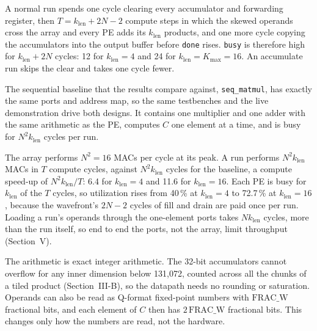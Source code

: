 A normal run spends one cycle clearing every accumulator and forwarding register, then $T = k_{\mathrm{len}} + 2N - 2$ compute steps in which the skewed operands cross the array and every PE adds its $k_{\mathrm{len}}$ products, and one more cycle copying the accumulators into the output buffer before \texttt{done} rises. \texttt{busy} is therefore high for $k_{\mathrm{len}} + 2N$ cycles: 12 for $k_{\mathrm{len}} = 4$ and 24 for $k_{\mathrm{len}} = K_{\max} = 16$. An accumulate run skips the clear and takes one cycle fewer.

The sequential baseline that the results compare against, \texttt{seq\_matmul}, has exactly the same ports and address map, so the same testbenches and the live demonstration drive both designs. It contains one multiplier and one adder with the same arithmetic as the PE, computes $C$ one element at a time, and is busy for $N^2 k_{\mathrm{len}}$ cycles per run.

The array performs $N^2 = 16$ MACs per cycle at its peak. A run performs $N^2 k_{\mathrm{len}}$ MACs in $T$ compute cycles, against $N^2 k_{\mathrm{len}}$ cycles for the baseline, a compute speed-up of $N^2 k_{\mathrm{len}}/T$: 6.4 for $k_{\mathrm{len}} = 4$ and 11.6 for $k_{\mathrm{len}} = 16$. Each PE is busy for $k_{\mathrm{len}}$ of the $T$ cycles, so utilization rises from 40\,\% at $k_{\mathrm{len}} = 4$ to 72.7\,\% at $k_{\mathrm{len}} = 16$, because the wavefront's $2N - 2$ cycles of fill and drain are paid once per run. Loading a run's operands through the one-element ports takes $N k_{\mathrm{len}}$ cycles, more than the run itself, so end to end the ports, not the array, limit throughput (Section~V).

The arithmetic is exact integer arithmetic. The 32-bit accumulators cannot overflow for any inner dimension below 131{,}072, counted across all the chunks of a tiled product (Section~III-B), so the datapath needs no rounding or saturation. Operands can also be read as Q-format fixed-point numbers with $\mathrm{FRAC\_W}$ fractional bits, and each element of $C$ then has $2\,\mathrm{FRAC\_W}$ fractional bits. This changes only how the numbers are read, not the hardware.
